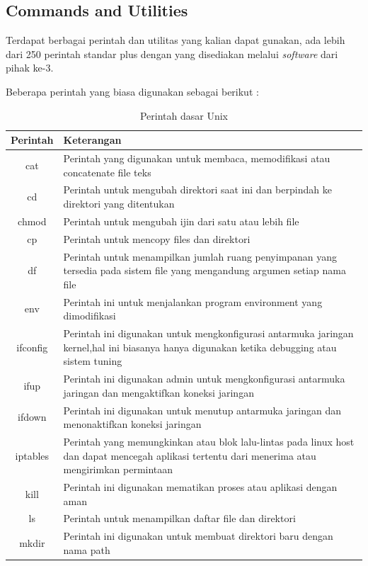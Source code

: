 \subsection{Commands and Utilities}
Terdapat berbagai perintah dan utilitas yang kalian dapat gunakan, ada lebih dari 250 perintah standar plus dengan yang disediakan melalui \textit{software} dari pihak ke-3. 

Beberapa perintah yang biasa digunakan sebagai berikut :

\begin{table}[h]
		\caption{Perintah dasar Unix}
		\label{commands}
			\begin{tabular}{|c|l|}
			\hline
			\textbf{Perintah}& \textbf{Keterangan} \\
			\hline
			cat&Perintah yang digunakan untuk membaca, memodifikasi atau concatenate file teks\\
			\hline
			cd&Perintah untuk mengubah direktori saat ini dan berpindah ke direktori yang ditentukan\\
			\hline
			chmod&Perintah untuk mengubah ijin dari satu atau lebih file\\
			\hline
			cp&Perintah untuk mencopy files dan direktori\\
			\hline
			df&Perintah untuk menampilkan jumlah ruang penyimpanan yang tersedia pada sistem file yang mengandung argumen setiap nama file\\
			\hline
			env&Perintah ini untuk menjalankan program environment yang dimodifikasi\\
			\hline
			ifconfig&Perintah ini digunakan untuk mengkonfigurasi antarmuka jaringan kernel,hal ini biasanya hanya digunakan ketika debugging atau sistem tuning\\
			\hline
			ifup&Perintah ini digunakan admin untuk mengkonfigurasi antarmuka jaringan dan mengaktifkan koneksi jaringan\\
			\hline
			ifdown&Perintah ini digunakan untuk menutup antarmuka jaringan dan menonaktifkan koneksi jaringan\\
			\hline
			iptables&Perintah yang memungkinkan atau blok lalu-lintas pada linux host dan dapat mencegah aplikasi tertentu dari menerima atau mengirimkan permintaan\\ 
			\hline
			kill&Perintah ini digunakan mematikan proses atau aplikasi dengan aman\\
			\hline
			ls&Perintah untuk menampilkan daftar file dan direktori\\
			\hline
			mkdir&Perintah ini digunakan untuk membuat direktori baru dengan nama path\\

\end{tabular}
\end{table}
